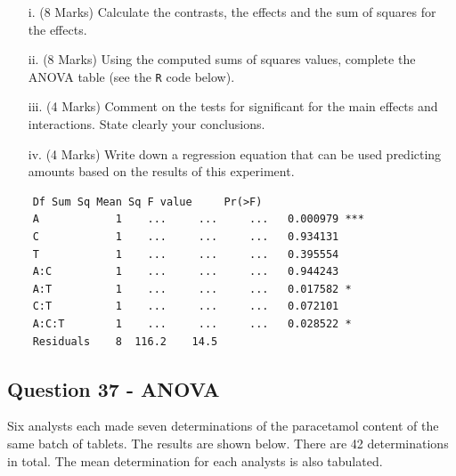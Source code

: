 \documentclass[a4paper,12pt]{article}
\begin{document}
\newpage


\begin{itemize}
	\item[i.] (8 Marks) Calculate the contrasts, the effects and the sum of squares for the effects.
	\item[ii.] (8 Marks) Using the computed sums of squares values, complete the ANOVA table (see the \texttt{R} code below).
	\item[iii.] (4 Marks) Comment on the tests for significant for the main effects and interactions. State clearly your conclusions.
	\item[iv.] (4 Marks) Write down a  regression equation that can be used predicting amounts based on the results of this experiment.
\end{itemize}

\begin{framed}
	\begin{verbatim}
	Df Sum Sq Mean Sq F value     Pr(>F)    
	A            1    ...     ...     ...   0.000979 ***
	C            1    ...     ...     ...   0.934131    
	T            1    ...     ...     ...   0.395554 
	A:C          1    ...     ...     ...   0.944243    
	A:T          1    ...     ...     ...   0.017582 *
	C:T          1    ...     ...     ...   0.072101
	A:C:T        1    ...     ...     ...   0.028522 *    
	Residuals    8  116.2    14.5                      
	\end{verbatim}
\end{framed}


\newpage

\subsection*{Question 37 - ANOVA} Six analysts each made seven determinations of the paracetamol content of the same batch of tablets.
The results are shown below. There are 42 determinations in total. The mean determination for each analysts is also tabulated. \\
\end{document}
